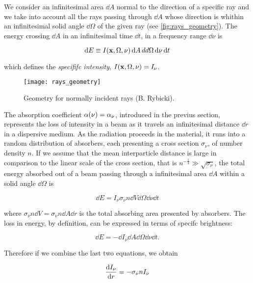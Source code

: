 We consider an infinitesimal area $\dd{A}$ normal to the direction of a
specific ray and we take into account all the rays passing through $\dd{A}$
whose direction is whithin an infinitesimal solid angle $\dd{\Omega}$ of
the given ray (see \autoref{fig:rays_geometry}). The energy crossing
$\dd{A}$ in an infinitesimal time $\dd{t}$, in a frequency range $\dd{\nu}$
is

\begin{equation}
        \dd{E} \equiv
        I\qty(\vb{x},\Omega,\nu)\dd{A}dd{\Omega}\dd{\nu}\dd{t}
\end{equation}

which defines the \emph{specififc intensity}, $I\qty(\vb{x},\Omega,\nu) =
I_\nu$.

\begin{figure}
        \centering
        \texttt{[image: rays\_geometry]}
        \caption{Geometry for normally incident rays (B. Rybicki).}
        \label{fig:rays_geometry}
\end{figure}

The absorption coefficient $\alpha\qty(\nu) = \alpha_\nu$, introduced in the
previus section, represents the loss of intensity in a beam as it travels an
infinitesimal distance $\dd{r}$ in a dispersive medium. As the radiation
proceeds in the material, it runs into a random distribution of absorbers,
each presenting a cross section $\sigma_\nu$, of number density $n$. If we
assume that the mean interparticle distance is large in comparison to the
linear scale of the cross section, that is $n^{-\frac{1}{3}} \gg
\sqrt{\sigma_\nu}$, the total energy absorbed out of a beam passing
through a infinitesimal area $\dd{A}$ within a solid angle $\dd{\Omega}$ is

\begin{equation}
        \dd{E} = I_\nu \sigma_\nu n \dd{V} \dd{\Omega} \dd{\nu} \dd{t}
\end{equation}

where $\sigma_\nu n \dd{V} = \sigma_\nu n \dd{A} \dd{r}$ is the total
absorbing area presented by absorbers. The loss in energy, by definition,
can be expressed in terms of specifc brightness:

\begin{equation}
        \dd{E} = -\dd{I_\nu} \dd{A} \dd{\Omega} \dd{\nu} \dd{t}.
\end{equation}

Therefore if we combine the last two equations, we obtain

\begin{equation}
        \dv{I_\nu}{r} = -\sigma_\nu n I_\nu
        \label{eq:absorption}
\end{equation}

